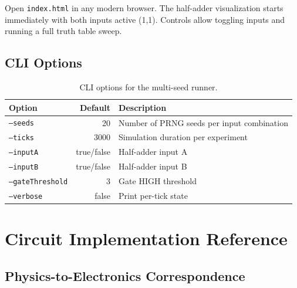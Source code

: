 \documentclass[11pt,a4paper]{article}
\begin{document}
Open \texttt{index.html} in any modern browser. The half-adder visualization starts immediately with both inputs active (1,1). Controls allow toggling inputs and running a full truth table sweep.

\subsection{CLI Options}

\begin{table}[H]
\centering
\begin{tabular}{lrl}
\toprule
\textbf{Option} & \textbf{Default} & \textbf{Description} \\
\midrule
\texttt{--seeds} & 20 & Number of PRNG seeds per input combination \\
\texttt{--ticks} & 3000 & Simulation duration per experiment \\
\texttt{--inputA} & true/false & Half-adder input A \\
\texttt{--inputB} & true/false & Half-adder input B \\
\texttt{--gateThreshold} & 3 & Gate HIGH threshold \\
\texttt{--verbose} & false & Print per-tick state \\
\bottomrule
\end{tabular}
\caption{CLI options for the multi-seed runner.}
\end{table}


\section{Circuit Implementation Reference}
\label{app:implementation}

\subsection{Physics-to-Electronics Correspondence}
\end{document}
